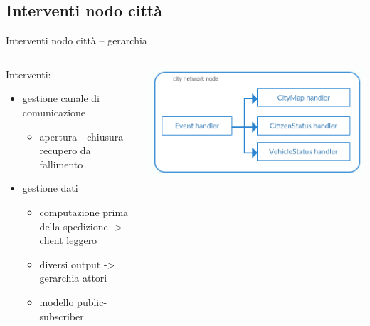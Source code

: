\subsection{Interventi nodo città}
\begin{frame}{Interventi nodo città -- \scriptsize{gerarchia}}
	\begin{columns}
		\begin{column}{0.6\textwidth}
			Interventi:
			\begin{itemize}
				\item{\footnotesize{gestione canale di comunicazione}}
				\begin{itemize}
					\item{\scriptsize{apertura - chiusura - recupero da fallimento}}
				\end{itemize}
				\item{\footnotesize{gestione dati}}
				\begin{itemize}
					\item{\scriptsize{computazione prima della spedizione -> client leggero}}
					\item{\scriptsize{diversi output -> gerarchia attori}}
					\item{\scriptsize{modello public-subscriber}}
				\end{itemize}
			\end{itemize}
		\end{column}
		\begin{column}{0.4\textwidth}
			\centering
			\includegraphics[scale=0.2]{images/cityEventHandlerHierarchy.png}
		\end{column}
	\end{columns}
\end{frame}

